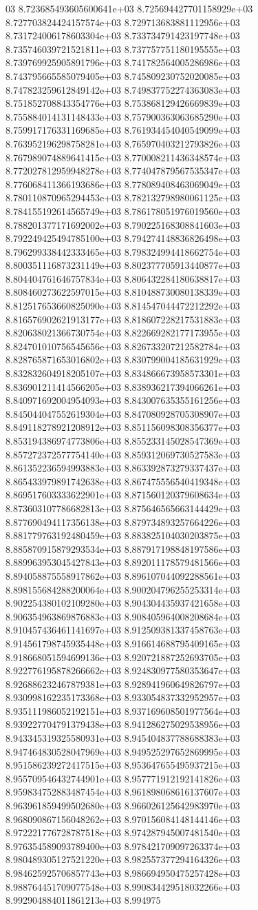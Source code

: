 03	8.723685493605600641e+03	8.725694427701158929e+03	8.727703824424157574e+03	8.729713683881112956e+03	8.731724006178603304e+03	8.733734791423197748e+03	8.735746039721521811e+03	8.737757751180195555e+03	8.739769925905891796e+03	8.741782564005286986e+03	8.743795665585079405e+03	8.745809230752020085e+03	8.747823259612849142e+03	8.749837752274363083e+03	8.751852708843354776e+03	8.753868129426669839e+03	8.755884014131148433e+03	8.757900363063685290e+03	8.759917176331169685e+03	8.761934454040549099e+03	8.763952196298758281e+03	8.765970403212793826e+03	8.767989074889641415e+03	8.770008211436348574e+03	8.772027812959948278e+03	8.774047879567535347e+03	8.776068411366193686e+03	8.778089408463069049e+03	8.780110870965294453e+03	8.782132798980061125e+03	8.784155192614565749e+03	8.786178051976019560e+03	8.788201377171692002e+03	8.790225168308841603e+03	8.792249425494785100e+03	8.794274148836826498e+03	8.796299338442333465e+03	8.798324994418662754e+03	8.800351116873231149e+03	8.802377705913440877e+03	8.804404761646757834e+03	8.806432284180638817e+03	8.808460273622597015e+03	8.810488730080138339e+03	8.812517653660825090e+03	8.814547044472212292e+03	8.816576902621913177e+03	8.818607228217531883e+03	8.820638021366730754e+03	8.822669282177173955e+03	8.824701010756545656e+03	8.826733207212582784e+03	8.828765871653016802e+03	8.830799004185631929e+03	8.832832604918205107e+03	8.834866673958573301e+03	8.836901211414566205e+03	8.838936217394066261e+03	8.840971692004954093e+03	8.843007635355161256e+03	8.845044047552619304e+03	8.847080928705308907e+03	8.849118278921208912e+03	8.851156098308356377e+03	8.853194386974773806e+03	8.855233145028547369e+03	8.857272372577754140e+03	8.859312069730527583e+03	8.861352236594993883e+03	8.863392873279337437e+03	8.865433979891742638e+03	8.867475556540419348e+03	8.869517603333622901e+03	8.871560120379608634e+03	8.873603107786682813e+03	8.875646565663144429e+03	8.877690494117356138e+03	8.879734893257664226e+03	8.881779763192480459e+03	8.883825104030203875e+03	8.885870915879293534e+03	8.887917198848197586e+03	8.889963953045427843e+03	8.892011178579481566e+03	8.894058875558917862e+03	8.896107044092288561e+03	8.898155684288200064e+03	8.900204796255253314e+03	8.902254380102109280e+03	8.904304435937421658e+03	8.906354963869876883e+03	8.908405964008208684e+03	8.910457436461141697e+03	8.912509381337458763e+03	8.914561798745935448e+03	8.916614688795409165e+03	8.918668051594699136e+03	8.920721887252693705e+03	8.922776195878266662e+03	8.924830977580353647e+03	8.926886232467879381e+03	8.928941960649826797e+03	8.930998162235173368e+03	8.933054837332952957e+03	8.935111986052192151e+03	8.937169608501977564e+03	8.939227704791379438e+03	8.941286275029538956e+03	8.943345319325580931e+03	8.945404837788688383e+03	8.947464830528047969e+03	8.949525297652869995e+03	8.951586239272417515e+03	8.953647655495937215e+03	8.955709546432744901e+03	8.957771912192141826e+03	8.959834752883487454e+03	8.961898068616137607e+03	8.963961859499502680e+03	8.966026125642983970e+03	8.968090867156048262e+03	8.970156084148144146e+03	8.972221776728787518e+03	8.974287945007481540e+03	8.976354589093789400e+03	8.978421709097263374e+03	8.980489305127521220e+03	8.982557377294164326e+03	8.984625925706857743e+03	8.986694950475257428e+03	8.988764451709077548e+03	8.990834429518032266e+03	8.992904884011861213e+03	8.994975